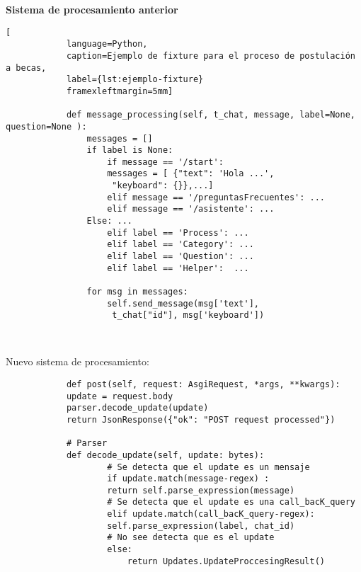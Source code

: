         \par \textbf{Sistema de procesamiento anterior}
        \begin{lstlisting}[
            language=Python, 
            caption=Ejemplo de fixture para el proceso de postulación a becas, 
            label={lst:ejemplo-fixture}
            framexleftmargin=5mm]

            def message_processing(self, t_chat, message, label=None, question=None ):
                messages = []
                if label is None:
                    if message == '/start':
                    messages = [ {"text": 'Hola ...',
                     "keyboard": {}},...]
                    elif message == '/preguntasFrecuentes': ...
                    elif message == '/asistente': ... 
                Else: ...
                    elif label == 'Process': ...
                    elif label == 'Category': ...
                    elif label == 'Question': ...
                    elif label == 'Helper':  ...
                
                for msg in messages:
                    self.send_message(msg['text'],
                     t_chat["id"], msg['keyboard'])
            
            
        \end{lstlisting}






        Nuevo sistema de procesamiento:

        \begin{lstlisting}
            def post(self, request: AsgiRequest, *args, **kwargs):
            update = request.body
            parser.decode_update(update)
            return JsonResponse({"ok": "POST request processed"})
        
            # Parser
            def decode_update(self, update: bytes):
                    # Se detecta que el update es un mensaje
                    if update.match(message-regex) :
                    return self.parse_expression(message)
                    # Se detecta que el update es una call_bacK_query
                    elif update.match(call_bacK_query-regex):
                    self.parse_expression(label, chat_id)
                    # No see detecta que es el update
                    else:
                        return Updates.UpdateProccesingResult()
        
        \end{lstlisting}




